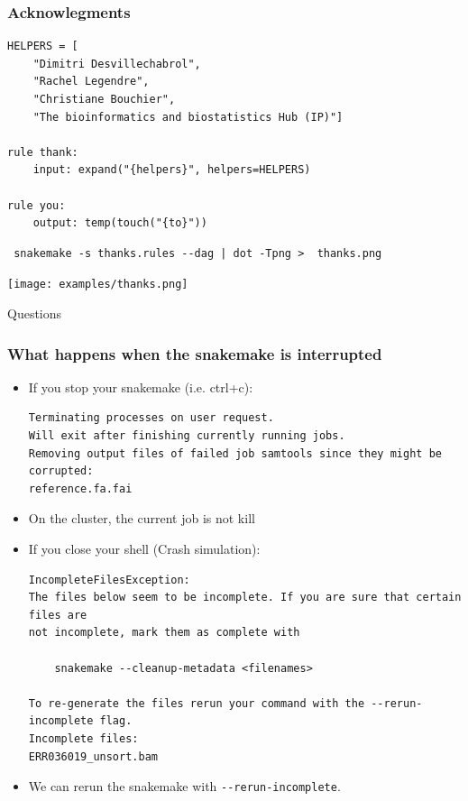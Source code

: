 \documentclass{beamer}
\begin{document}
\begin{frame}[fragile]
\frametitle{Acknowlegments}
\centering
\pause
\begin{lstlisting}
HELPERS = [
    "Dimitri Desvillechabrol",
    "Rachel Legendre",
    "Christiane Bouchier",
    "The bioinformatics and biostatistics Hub (IP)"]

rule thank:
    input: expand("{helpers}", helpers=HELPERS)

rule you:
    output: temp(touch("{to}"))
\end{lstlisting}
\pause
\begin{block}{}
\begin{lstlisting}
 snakemake -s thanks.rules --dag | dot -Tpng >  thanks.png
\end{lstlisting}
\end{block}

\texttt{[image: examples/thanks.png]}
\end{frame}


\begin{frame}[plain]
 \centering
 \begin{Huge}
  Questions 
 \end{Huge}
\end{frame}

 


\begin{frame}[fragile]
    \frametitle{What happens when the snakemake is interrupted}
    \begin{itemize}
        \item If you stop your snakemake (i.e. ctrl+c):
        \begin{lstlisting}[language={}]
Terminating processes on user request.
Will exit after finishing currently running jobs.
Removing output files of failed job samtools since they might be corrupted:
reference.fa.fai
        \end{lstlisting}
        \item On the cluster, the current job is not kill
        \item If you close your shell (Crash simulation):
        \begin{lstlisting}[language={}]
IncompleteFilesException:
The files below seem to be incomplete. If you are sure that certain files are 
not incomplete, mark them as complete with

    snakemake --cleanup-metadata <filenames>

To re-generate the files rerun your command with the --rerun-incomplete flag.
Incomplete files:
ERR036019_unsort.bam
        \end{lstlisting}
        \item We can rerun the snakemake with \lstinline[basicstyle=\small\ttfamily]{--rerun-incomplete}.
    \end{itemize}
\end{frame}
\end{document}
